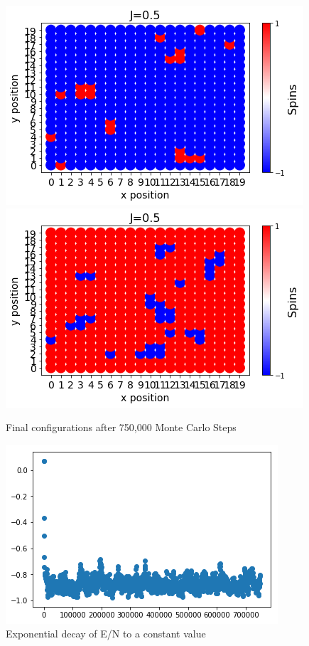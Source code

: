 \documentclass{article}
\begin{document}
	


	\begin{figure}[H]
		\centering
		\includegraphics[scale=0.5]{J=05a.png}
		\includegraphics[scale=0.5]{J=05c.png}
		\caption{Final configurations after 750,000 Monte Carlo Steps}
	\end{figure}

	\begin{figure}[H]
		\centering
		\includegraphics[scale=0.75]{J=05b}
		\caption{Exponential decay of E/N to a constant value}
	\end{figure}
\end{document}
